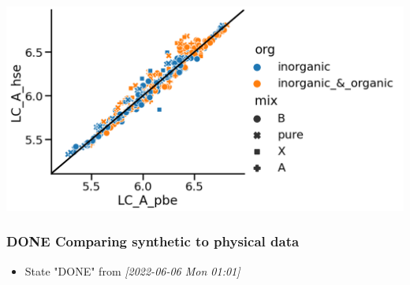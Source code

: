 \documentclass[twoside, twocolumn, 9pt, draft]{article}
\begin{document}
\begin{center}
\includegraphics[width=.9\linewidth]{pbe_v_hse_LC.png}
\end{center}

\subsubsection*{{\bfseries\sffamily DONE} Comparing synthetic to physical data}
\label{sec:org84f902b}
\begin{itemize}
\item State "DONE"       from              \textit{[2022-06-06 Mon 01:01]}
\end{itemize}
\end{document}
